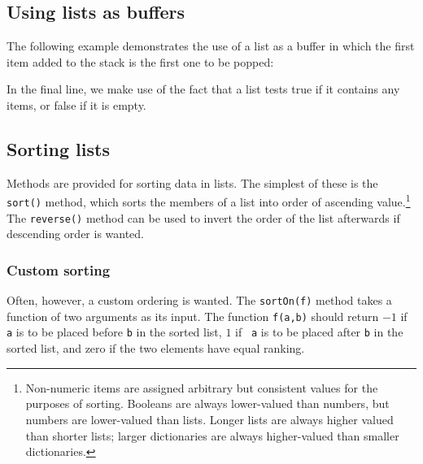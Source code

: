 \vspace{3mm}

\vspace{3mm}

\subsection{Using lists as buffers}

The following example demonstrates the use of a list as a buffer in which the
first item added to the stack is the first one to be popped:

\vspace{3mm}

\vspace{3mm}

\noindent In the final line, we make use of the fact that a list tests true if
it contains any items, or false if it is empty.

\subsection{Sorting lists}

Methods are provided for sorting data in lists. The simplest of these is the
{\tt sort()} method, which sorts the members of a list into order of ascending
value.\footnote{Non-numeric items are assigned arbitrary but consistent values
for the purposes of sorting.  Booleans are always lower-valued than numbers,
but numbers are lower-valued than lists. Longer lists are always higher valued
than shorter lists; larger dictionaries are always higher-valued than smaller
dictionaries.} The {\tt reverse()} method can be used to invert the order of
the list afterwards if descending order is wanted.

\vspace{3mm}

\vspace{3mm}

\subsubsection{Custom sorting}

Often, however, a custom ordering is wanted. The {\tt sortOn(f)} method takes a
function of two arguments as its input. The function {\tt f(a,b)} should return
$-1$ if {\tt a} is to be placed before {\tt b} in the sorted list, $1$ if {\tt
a} is to be placed after {\tt b} in the sorted list, and zero if the two
elements have equal ranking.

